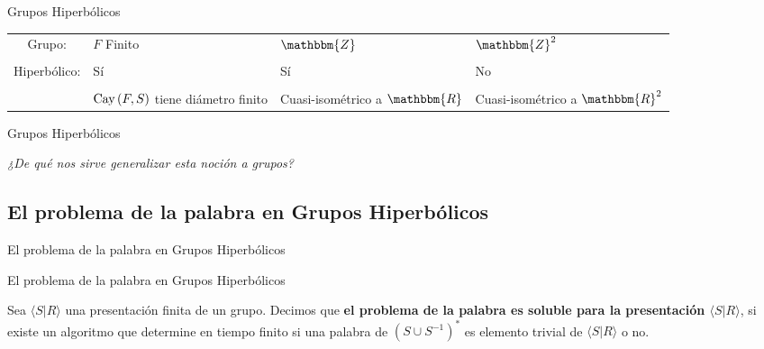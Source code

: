 \documentclass[xcolor=dvipsnames,aspectratio=159]{beamer}
\theoremstyle{largebreak}
\newcommand{\bbm}[1]{\ensuremath{\mathbbm{#1}}}
\newcommand{\Cay}[1]{\ensuremath{\textup{Cay}\left(#1\right)}}
\newcommand{\gen}[1]{\ensuremath{\langle#1\rangle}}
\begin{document}
\begin{frame}{Grupos Hiperbólicos}

    \begin{center}
        \begin{tabular}{c | p{2.5cm}  p{2.5cm}  p{2.5cm}}
            Grupo: & $F$ Finito & $\bbm{Z}$ & $\bbm{Z}^2$ \\
              &  &  \\
            \pause Hiperbólico: & Sí & Sí & No \\
            &  &  \\
             \pause  & $\Cay{F,S}$ tiene diámetro finito & Cuasi-isométrico a $\bbm{R}$ & Cuasi-isométrico a $\bbm{R}^2$ \\
        \end{tabular}
    \end{center}

\end{frame}

\begin{frame}{Grupos Hiperbólicos}
    \begin{center}
        \Large \textit{¿De qué nos sirve generalizar esta noción a grupos?}
    \end{center}
\end{frame}

\subsection{El problema de la palabra en Grupos Hiperbólicos}

\begin{frame}
    \begin{center}
        \Large El problema de la palabra en Grupos Hiperbólicos
    \end{center}

\end{frame}

\begin{frame}{El problema de la palabra en Grupos Hiperbólicos}
    \begin{mydef}
        Sea $\gen{S|R}$ una presentación finita de un grupo. Decimos que \textbf{el problema de la palabra es soluble para la presentación $\gen{S|R}$}, si existe un algoritmo que determine en tiempo finito si una palabra de $(S\cup S^{-1})^*$ es elemento trivial de $\gen{S|R}$ o no.
    \end{mydef}
\end{frame}
\end{document}
